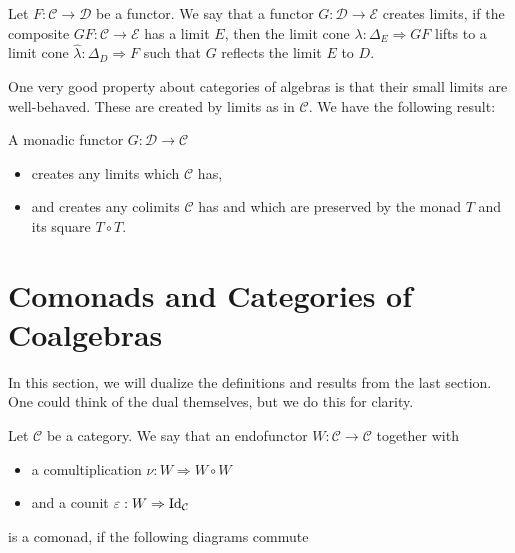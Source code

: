 \documentclass[../thesis.tex]{subfiles}
\begin{document}
        \begin{definition}
            Let $F: \mathcal{C} \rightarrow \mathcal{D}$ be a functor. We say that a functor $G: \mathcal{D} \rightarrow \mathcal{E}$ creates limits, if the composite $GF : \mathcal{C} \rightarrow \mathcal{E}$ has a limit $E$, then the limit cone $\lambda : \Delta_E \Rightarrow GF$ lifts to a limit cone $\widehat{\lambda} : \Delta_D \Rightarrow F$ such that $G$ reflects the limit $E$ to $D$. 
        \end{definition}

        One very good property about categories of algebras is that their small limits are well-behaved. These are created by limits as in $\mathcal{C}$. We have the following result:
        \begin{thm}
            A monadic functor $G : \mathcal{D} \rightarrow \mathcal{C}$
            \begin{itemize}
                \item creates any limits which $\mathcal{C}$ has,
                \item and creates any colimits $\mathcal{C}$ has and which are preserved by the monad $T$ and its square $T\circ T$.
            \end{itemize}
        \end{thm}

    \section{Comonads and Categories of Coalgebras}
        In this section, we will dualize the definitions and results from the last section. One could think of the dual themselves, but we do this for clarity.

    \begin{definition}[Comonad]
        Let $\mathcal{C}$ be a category. We say that an endofunctor $W : \mathcal{C} \rightarrow \mathcal{C}$ together with
        \begin{itemize}
            \item a comultiplication $\nu : W \Rightarrow W\circ W$
            \item and a counit $\varepsilon : W \Rightarrow \tt{Id}_\mathcal{C}$
        \end{itemize}
        is a comonad, if the following diagrams commute
        \begin{center}
        \end{center}
    \end{definition}
\end{document}
